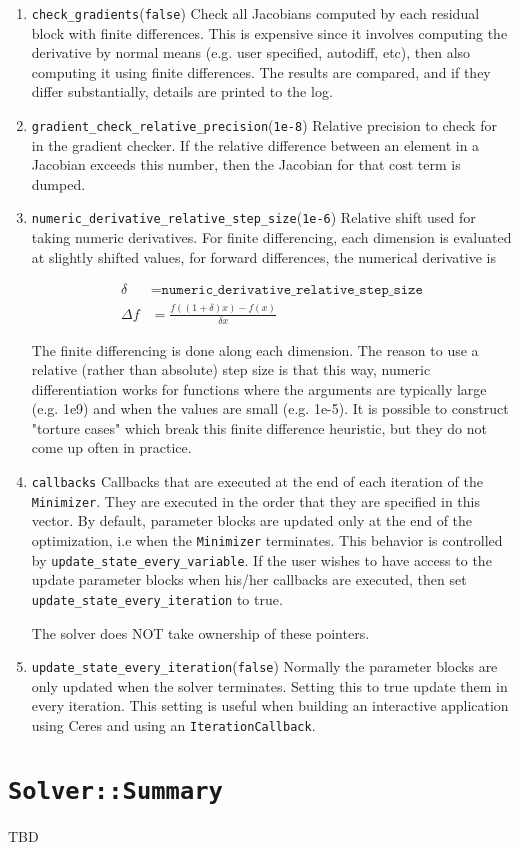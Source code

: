 \begin{enumerate}
\item{\texttt{check\_gradients}}(\texttt{false})
 Check all Jacobians computed by each residual block with finite
     differences. This is expensive since it involves computing the
     derivative by normal means (e.g. user specified, autodiff,
     etc), then also computing it using finite differences. The
     results are compared, and if they differ substantially, details
     are printed to the log.

\item{\texttt{gradient\_check\_relative\_precision}}(\texttt{1e-8})
  Relative precision to check for in the gradient checker. If the
  relative difference between an element in a Jacobian exceeds
  this number, then the Jacobian for that cost term is dumped.

\item{\texttt{numeric\_derivative\_relative\_step\_size}}(\texttt{1e-6})
 Relative shift used for taking numeric derivatives. For finite
     differencing, each dimension is evaluated at slightly shifted
     values, \eg for forward differences, the numerical derivative is
  
\begin{align}
       \delta &= \texttt{numeric\_derivative\_relative\_step\_size}\\
       \Delta f &= \frac{f((1 + \delta)  x) - f(x)}{\delta x}
\end{align} 


     The finite differencing is done along each dimension. The
     reason to use a relative (rather than absolute) step size is
     that this way, numeric differentiation works for functions where
     the arguments are typically large (e.g. 1e9) and when the
     values are small (e.g. 1e-5). It is possible to construct
     "torture cases" which break this finite difference heuristic,
     but they do not come up often in practice.

\item{\texttt{callbacks}} 
  Callbacks that are executed at the end of each iteration of the
     \texttt{Minimizer}. They are executed in the order that they are
     specified in this vector. By default, parameter blocks are
     updated only at the end of the optimization, i.e when the
     \texttt{Minimizer} terminates. This behavior is controlled by
     \texttt{update\_state\_every\_variable}. If the user wishes to have access
     to the update parameter blocks when his/her callbacks are
     executed, then set \texttt{update\_state\_every\_iteration} to true.
    
     The solver does NOT take ownership of these pointers.

\item{\texttt{update\_state\_every\_iteration}}(\texttt{false})
Normally the parameter blocks are only updated when the solver terminates. Setting this to true update them in every iteration. This setting is useful when building an interactive application using Ceres and using an \texttt{IterationCallback}.
\end{enumerate}

\section{\texttt{Solver::Summary}}
TBD